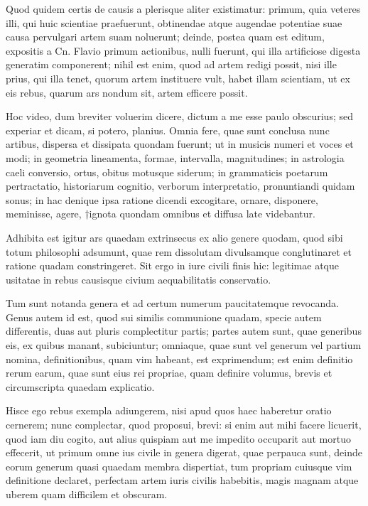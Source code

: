  Quod quidem certis de causis a plerisque aliter existimatur: primum, quia veteres illi, qui huic scientiae praefuerunt, obtinendae atque augendae potentiae suae causa pervulgari artem suam noluerunt; deinde, postea quam est editum, expositis a Cn. Flavio primum actionibus, nulli fuerunt, qui illa artificiose digesta generatim componerent; nihil est enim, quod ad artem redigi possit, nisi ille prius, qui illa tenet, quorum artem instituere vult, habet illam scientiam, ut ex eis rebus, quarum ars nondum sit, artem efficere possit.

 Hoc video, dum breviter voluerim dicere, dictum a me esse paulo obscurius; sed experiar et dicam, si potero, planius. Omnia fere, quae sunt conclusa nunc artibus, dispersa et dissipata quondam fuerunt; ut in musicis numeri et voces et modi; in geometria lineamenta, formae, intervalla, magnitudines; in astrologia caeli conversio, ortus, obitus motusque siderum; in grammaticis poetarum pertractatio, historiarum cognitio, verborum interpretatio, pronuntiandi quidam sonus; in hac denique ipsa ratione dicendi excogitare, ornare, disponere, meminisse, agere, †ignota quondam omnibus et diffusa late videbantur.

 Adhibita est igitur ars quaedam extrinsecus ex alio genere quodam, quod sibi totum philosophi adsumunt, quae rem dissolutam divulsamque conglutinaret et ratione quadam constringeret. Sit ergo in iure civili finis hic: legitimae atque usitatae in rebus causisque civium aequabilitatis conservatio.

 Tum sunt notanda genera et ad certum numerum paucitatemque revocanda. Genus autem id est, quod sui similis communione quadam, specie autem differentis, duas aut pluris complectitur partis; partes autem sunt, quae generibus eis, ex quibus manant, subiciuntur; omniaque, quae sunt vel generum vel partium nomina, definitionibus, quam vim habeant, est exprimendum; est enim definitio rerum earum, quae sunt eius rei propriae, quam definire volumus, brevis et circumscripta quaedam explicatio.

 Hisce ego rebus exempla adiungerem, nisi apud quos haec haberetur oratio cernerem; nunc complectar, quod proposui, brevi: si enim aut mihi facere licuerit, quod iam diu cogito, aut alius quispiam aut me impedito occuparit aut mortuo effecerit, ut primum omne ius civile in genera digerat, quae perpauca sunt, deinde eorum generum quasi quaedam membra dispertiat, tum propriam cuiusque vim definitione declaret, perfectam artem iuris civilis habebitis, magis magnam atque uberem quam difficilem et obscuram.

